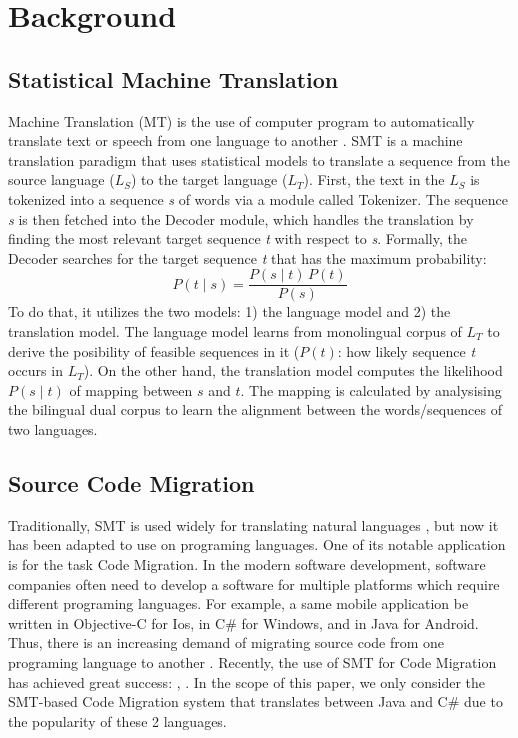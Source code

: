 
\section{Background}
\subsection{Statistical Machine Translation}
Machine Translation (MT) is the use of computer program to automatically translate text or speech from one language to another \cite{MT93}. SMT is a machine translation paradigm that uses statistical models to translate a sequence from the source language ($L_S$) to the target language ($L_T$). First, the text in the $L_S$ is tokenized into a sequence \textit{s} of words via a module called Tokenizer. The sequence \textit{s} is then fetched into the Decoder module, which handles the translation by finding the most relevant target sequence \textit{t} with respect to \textit{s}. Formally, the Decoder searches for the target sequence \textit{t} that has the maximum probability:
$$ P\left(t \mid s \right) = \frac{P\left(s \mid t\right) \, P\left(t\right)}{P\left(s\right)} $$
To do that, it utilizes the two models: 1) the language model and 2) the translation model. The language model learns from monolingual corpus of $L_T$ to derive the posibility of feasible sequences in it ($P\left(t\right)$: how likely sequence \textit{t} occurs in $L_T$). On the other hand, the translation model computes the likelihood $P\left(s \mid t\right)$ of mapping between $s$ and $t$. The mapping is calculated by analysising the bilingual dual corpus to learn the alignment between the words/sequences of two languages.

\subsection{Source Code Migration}
Traditionally, SMT is used widely for translating natural languages \cite{smtbook}, but now it has been adapted to use on programing languages. One of its notable application is for the task Code Migration. In the modern software development, software companies often need to develop a software for multiple platforms which require different programing languages. For example, a same mobile application be written in Objective-C for Ios, in C\# for Windows, and in Java for Android. Thus, there is an increasing demand of migrating source code from one programing language to another \cite{Wu2010}. Recently, the use of SMT for Code Migration has achieved great success: \cite{mppSMT}, \cite{phrasalSMT}. In the scope of this paper, we only consider the SMT-based Code Migration system that translates between Java and C\# due to the popularity of these 2 languages. 



